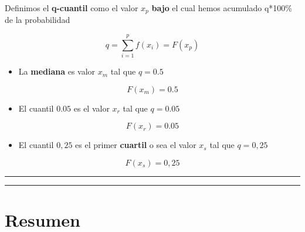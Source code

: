 \documentclass[
]{book}
\providecommand{\tightlist}{%
  \setlength{\itemsep}{0pt}\setlength{\parskip}{0pt}}
\begin{document}
Definimos el \textbf{q-cuantil} como el valor \(x_{p}\) \textbf{bajo} el cual hemos acumulado q*100\% de la probabilidad

\[q=\sum_{i=1}^p f(x_i) = F (x_p)\]

\begin{itemize}
\tightlist
\item
  La \textbf{mediana} es valor \(x_m\) tal que \(q=0.5\)
\end{itemize}

\[F(x_{m})=0.5\]

\begin{itemize}
\tightlist
\item
  El cuantil \(0.05\) es el valor \(x_{r}\) tal que \(q=0.05\)
\end{itemize}

\[F(x_{r})=0.05\]

\begin{itemize}
\tightlist
\item
  El cuantil \(0,25\) es el primer \textbf{cuartil} o sea el valor \(x_{s}\) tal que \(q=0,25\)
\end{itemize}

\[F(x_{s})=0,25\]

\begin{center}\rule{0.5\linewidth}{0.5pt}\end{center}

\begin{center}\rule{0.5\linewidth}{0.5pt}\end{center}

\hypertarget{resumen}{%
\section{Resumen}\label{resumen}}
\end{document}
